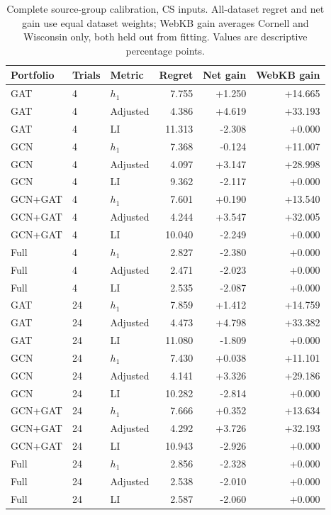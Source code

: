 \begin{table}[tbp]
\centering
\caption{Complete source-group calibration, CS inputs. All-dataset regret and net gain use equal dataset weights; WebKB gain averages Cornell and Wisconsin only, both held out from fitting. Values are descriptive percentage points.}
\label{tab:group_all_CS}
\small
\setlength{\tabcolsep}{3pt}
\begin{tabular}{@{}lllrrr@{}}
\toprule
Portfolio & Trials & Metric & Regret & Net gain & WebKB gain \\
\midrule
GAT & 4 & $h_1$ & 7.755 & +1.250 & +14.665 \\
GAT & 4 & Adjusted & 4.386 & +4.619 & +33.193 \\
GAT & 4 & LI & 11.313 & -2.308 & +0.000 \\
GCN & 4 & $h_1$ & 7.368 & -0.124 & +11.007 \\
GCN & 4 & Adjusted & 4.097 & +3.147 & +28.998 \\
GCN & 4 & LI & 9.362 & -2.117 & +0.000 \\
GCN+GAT & 4 & $h_1$ & 7.601 & +0.190 & +13.540 \\
GCN+GAT & 4 & Adjusted & 4.244 & +3.547 & +32.005 \\
GCN+GAT & 4 & LI & 10.040 & -2.249 & +0.000 \\
Full & 4 & $h_1$ & 2.827 & -2.380 & +0.000 \\
Full & 4 & Adjusted & 2.471 & -2.023 & +0.000 \\
Full & 4 & LI & 2.535 & -2.087 & +0.000 \\
GAT & 24 & $h_1$ & 7.859 & +1.412 & +14.759 \\
GAT & 24 & Adjusted & 4.473 & +4.798 & +33.382 \\
GAT & 24 & LI & 11.080 & -1.809 & +0.000 \\
GCN & 24 & $h_1$ & 7.430 & +0.038 & +11.101 \\
GCN & 24 & Adjusted & 4.141 & +3.326 & +29.186 \\
GCN & 24 & LI & 10.282 & -2.814 & +0.000 \\
GCN+GAT & 24 & $h_1$ & 7.666 & +0.352 & +13.634 \\
GCN+GAT & 24 & Adjusted & 4.292 & +3.726 & +32.193 \\
GCN+GAT & 24 & LI & 10.943 & -2.926 & +0.000 \\
Full & 24 & $h_1$ & 2.856 & -2.328 & +0.000 \\
Full & 24 & Adjusted & 2.538 & -2.010 & +0.000 \\
Full & 24 & LI & 2.587 & -2.060 & +0.000 \\
\bottomrule
\end{tabular}
\end{table}
